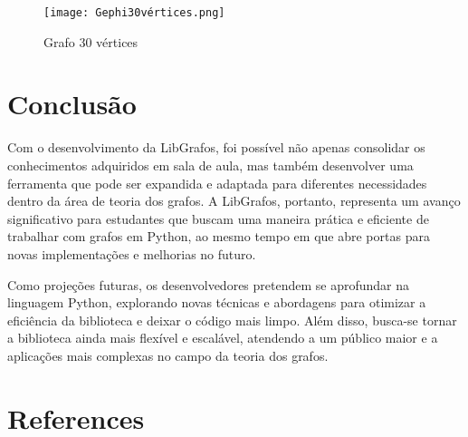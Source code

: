 \documentclass[12pt]{article}
\begin{document}
\begin{figure}[ht]
\centering
\texttt{[image: Gephi30vértices.png]}
\caption{Grafo 30 vértices}
\label{fig:exampleFig1}
\end{figure}

\section{Conclusão}

Com o desenvolvimento da LibGrafos, foi possível não apenas consolidar os conhecimentos adquiridos em sala de aula, mas também desenvolver uma ferramenta que pode ser expandida e adaptada para diferentes necessidades dentro da área de teoria dos grafos. A LibGrafos, portanto, representa um avanço significativo para estudantes que buscam uma maneira prática e eficiente de trabalhar com grafos em Python, ao mesmo tempo em que abre portas para novas implementações e melhorias no futuro.

Como projeções futuras, os desenvolvedores pretendem se aprofundar na linguagem Python, explorando novas técnicas e abordagens para otimizar a eficiência da biblioteca e deixar o código mais limpo. Além disso, busca-se tornar a biblioteca ainda mais flexível e escalável, atendendo a um público maior e a aplicações mais complexas no campo da teoria dos grafos.

\clearpage

\section{References}

\cite{vidhya:2019}



\end{document}
